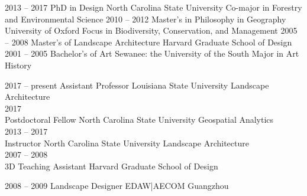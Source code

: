 \documentclass[10pt]{developercv} %
\begin{document}


\begin{entrylist}
	\entry
		{2013 -- 2017}
		{PhD in Design}
		{North Carolina State University}
		{Co-major in Forestry and Environmental Science}
	\entry
		{2010 -- 2012}
		{Master's in Philosophy in Geography}
		{University of Oxford}
		{Focus in Biodiversity, Conservation, and Management}
	\entry
		{2005 -- 2008}
		{Master's of Landscape Architecture}
		{Harvard Graduate School of Design}
		{}
	\entry
		{2001 -- 2005}
		{Bachelor's of Art}
		{Sewanee: the University of the South}
		{Major in Art History}
\end{entrylist}



\begin{entrylist}
	\entry
		{2017 -- present}
		{Assistant Professor}
		{Louisiana State University}
		{Landscape Architecture\\
		}
	\entry
		{2017\\\footnotesize{}}
		{Postdoctoral Fellow}
		{North Carolina State University}
		{Geospatial Analytics\\
		}
	\entry
		{2013 -- 2017\\\footnotesize{}}
		{Instructor}
		{North Carolina State University}
		{Landscape Architecture\\
		}
	\entry
		{2007 -- 2008\\\footnotesize{}}
		{3D Teaching Assistant}
		{Harvard Graduate School of Design}
		{%
		}
\end{entrylist}


\begin{entrylist}
	\entry
		{2008 -- 2009}
		{Landscape Designer}
		{EDAW|AECOM Guangzhou}
		{%
		}
\end{entrylist}
\end{document}
